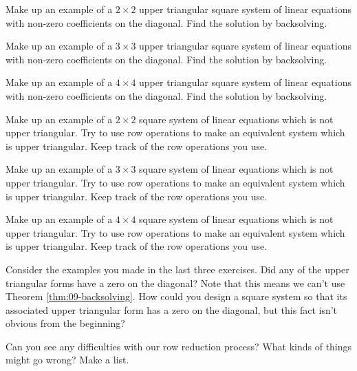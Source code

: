 \documentclass[elementsmain.tex]{subfiles}
\begin{document}
\begin{exercise} Make up an example of a $2\times 2$ upper triangular square system of linear equations with non-zero coefficients on the diagonal. Find the solution by backsolving.
\end{exercise}

\begin{exercise} Make up an example of a $3\times 3$ upper triangular square system of linear equations with non-zero coefficients on the diagonal. Find the solution by backsolving.
\end{exercise}

\begin{exercise} Make up an example of a $4\times 4$ upper triangular square system of linear equations with non-zero coefficients on the diagonal. Find the solution by backsolving.
\end{exercise}

\begin{exercise} Make up an example of a $2\times 2$ square system of linear equations which is not upper triangular. Try to use row operations to make an equivalent system which is upper triangular. Keep track of the row operations you use. 
\end{exercise}

\begin{exercise} Make up an example of a $3\times 3$ square system of linear equations which is not upper triangular. Try to use row operations to make an equivalent system which is upper triangular. Keep track of the row operations you use.
\end{exercise}

\begin{exercise} Make up an example of a $4\times 4$ square system of linear equations which is not upper triangular. Try to use row operations to make an equivalent system which is upper triangular. Keep track of the row operations you use.
\end{exercise}

\begin{exercise}
Consider the examples you made in the last three exercises. Did any of the upper triangular forms have a zero on the diagonal? Note that this means we can't use Theorem \ref{thm:09-backsolving}. How could you design a square system so that its associated upper triangular form has a zero on the diagonal, but this fact isn't obvious from the beginning?
\end{exercise}

\begin{exercise}
Can you see any difficulties with our row reduction process? What kinds of things might go wrong? Make a list.
\end{exercise}



\clearpage
\end{document}
